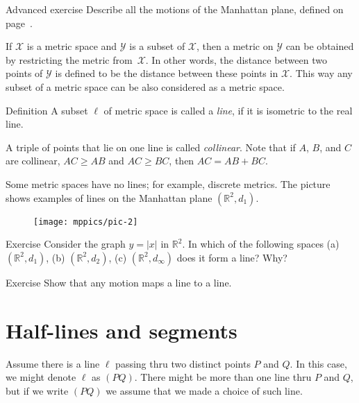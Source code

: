 \begin{thm}{Advanced exercise}\label{ad-ex:motions of Manhattan plane}
Describe all the motions of the Manhattan plane, defined on page~\pageref{Manhattan plane}.
\end{thm}

If $\mathcal X$ is a metric space and $\mathcal Y$ is a subset of $\mathcal X$,
then a metric on $\mathcal Y$ can be obtained by restricting the metric from~$\mathcal X$. 
In other words, 
the distance between two points of $\mathcal Y$ is defined to be the distance between these points in $\mathcal X$.
This way any subset of a metric space can be also considered as a metric space. 

\begin{thm}{Definition}\label{def:line}
A subset $\ell$ of metric space is called a \emph{line}, if it is isometric to the real line.
\end{thm}

A triple of points that lie on one line is called \emph{collinear}.
Note that if $A$, $B$, and  $C$ are  collinear, $AC\ge AB$ and $AC\ge BC$, then $AC= AB+BC$.

Some metric spaces have no lines; for example, discrete metrics.
The picture shows examples of lines on the Manhattan plane $(\mathbb{R}^2,d_1)$. 
\begin{figure}[!ht]
\centering
\texttt{[image: mppics/pic-2]}
\end{figure}

\begin{thm}{Exercise}\label{ex:y=|x|}
Consider the graph $y=|x|$ in $\mathbb{R}^2$.
In which of the following spaces 
(a) $(\mathbb{R}^2,d_1)$, 
(b) $(\mathbb{R}^2,d_2)$, 
(c) $(\mathbb{R}^2,d_\infty)$ 
does it form a line? 
Why?
\end{thm}

\begin{thm}{Exercise}\label{ex:line-motion}
Show that any motion maps a line to a line. 
\end{thm}

\section*{Half-lines and segments}

Assume there is a line $\ell$ passing thru
two distinct points $P$ and $Q$.
In this case, we might denote $\ell$ as $(PQ)$.
There might be more than one line thru $P$ and $Q$,
but if we write \index{60@$(PQ)$, $[PQ)$, $[PQ]$}$(PQ)$ we assume that we made a choice of such line. 


